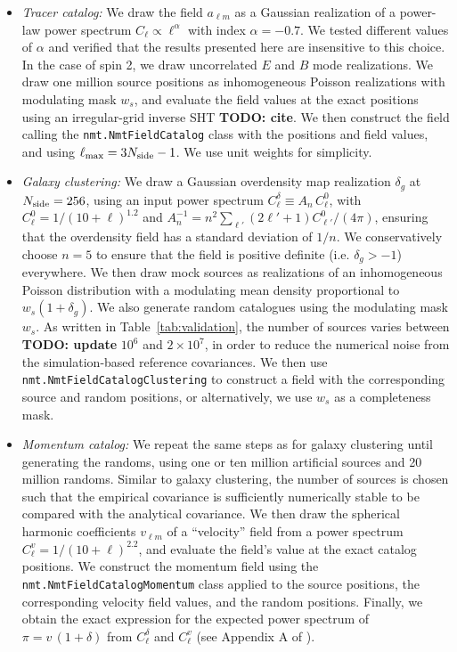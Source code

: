 \documentclass[aps,twocolumn, superscriptaddress, english, nofootinbib, 10pt]{revtex4-2}
\newcommand{\todo}[1]{{\color{blue}\bf TODO: #1}}
\begin{document}
    \begin{itemize}
        \item {\it Tracer catalog:} We draw the field $a_{\ell m}$ as a Gaussian realization of a power-law power spectrum $C_\ell\propto\ell^\alpha$ with index $\alpha=-0.7$. We tested different values of $\alpha$ and verified that the results presented here are insensitive to this choice. In the case of spin 2, we draw uncorrelated $E$ and $B$ mode realizations. We draw one million source positions as inhomogeneous Poisson realizations with modulating mask $w_s$, and evaluate the field values at the exact positions using an irregular-grid inverse SHT \todo{cite}. We then construct the field calling the \texttt{nmt.NmtFieldCatalog} class with the positions and field values, and using $\ell_{\rm max}=3N_{\rm side}-1$. We use unit weights for simplicity.
        
        \item {\it Galaxy clustering:} We draw a Gaussian overdensity map realization $\delta_g$ at $N_{\rm side}=256$, using an input power spectrum $C_\ell^\delta\equiv A_n\, C^0_\ell$, with $C_\ell^0=1/(10+\ell)^{1.2}$ and $A_n^{-1}=n^2\sum_{\ell'}(2\ell'+1)C_{\ell'}^0/(4\pi)$, ensuring that the overdensity field has a standard deviation of $1/n$. We conservatively choose $n=5$ to ensure that the field is positive definite (i.e. $\delta_g>-1$) everywhere. We then draw mock sources as realizations of an inhomogeneous Poisson distribution with a modulating mean density proportional to $w_s(1+\delta_g)$. We also generate random catalogues using the modulating mask $w_s$. As written in Table~\ref{tab:validation}, the number of sources varies between \todo{update} $10^6$ and $2\times10^7$, in order to reduce the numerical noise from the simulation-based reference covariances. We then use \texttt{nmt.NmtFieldCatalogClustering} to construct a field with the corresponding source and random positions, or alternatively, we use $w_s$ as a completeness mask.
        
        \item {\it Momentum catalog:} We repeat the same steps as for galaxy clustering until generating the randoms, using one or ten million artificial sources and 20 million randoms. Similar to galaxy clustering, the number of sources is chosen such that the empirical covariance is sufficiently numerically stable to be compared with the analytical covariance. We then draw the spherical harmonic coefficients $v_{\ell m}$ of a ``velocity'' field from a power spectrum $C_\ell^v=1/(10+\ell)^{2.2}$, and evaluate the field's value at the exact catalog positions. We construct the momentum field using the \texttt{nmt.NmtFieldCatalogMomentum} class applied to the source positions, the corresponding velocity field values, and the random positions. Finally, we obtain the exact expression for the expected power spectrum of $\pi=v\,(1+\delta)$ from $C_\ell^\delta$ and $C_\ell^v$ (see Appendix A of \cite{2512.14625}).
    \end{itemize}
\end{document}
